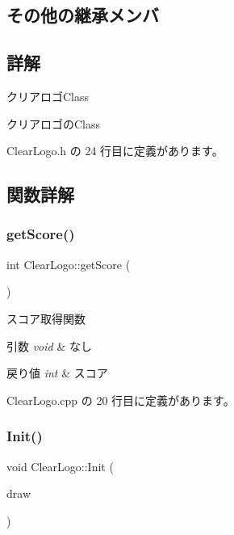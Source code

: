 \subsection*{その他の継承メンバ}


\subsection{詳解}
クリアロゴ\+Class 

クリアロゴの\+Class 

 Clear\+Logo.\+h の 24 行目に定義があります。



\subsection{関数詳解}
\mbox{\label{class_clear_logo_ab19c1b71853014f6a037db63e1a052d4}} 
\subsubsection{\texorpdfstring{get\+Score()}{getScore()}}
{\footnotesize\ttfamily int Clear\+Logo\+::get\+Score (\begin{DoxyParamCaption}{ }\end{DoxyParamCaption})}



スコア取得関数 


\begin{DoxyParams}{引数}
{\em void} & なし \\
\hline
\end{DoxyParams}

\begin{DoxyRetVals}{戻り値}
{\em int} & スコア \\
\hline
\end{DoxyRetVals}


 Clear\+Logo.\+cpp の 20 行目に定義があります。

\mbox{\label{class_clear_logo_a46c1a948342d75bb418047a31e70999d}} 
\subsubsection{\texorpdfstring{Init()}{Init()}}
{\footnotesize\ttfamily void Clear\+Logo\+::\+Init (\begin{DoxyParamCaption}\item[{\mbox{\hyperlink{class_draw_base}{Draw\+Base}} $\ast$}]{draw }\end{DoxyParamCaption})}



